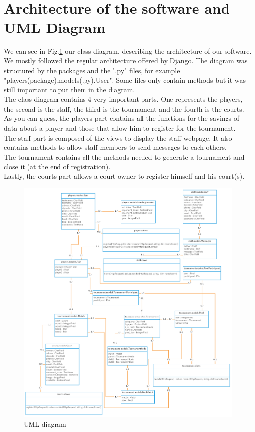 \documentclass[a4paper, 12pt]{article}
\begin{document}
\newpage
\section{Architecture of the software and UML Diagram}
We can see in Fig.\ref{UML_diagram} our class diagram, describing the architecture of our software. We mostly followed the regular architecture offered by Django. The diagram was structured by the packages and the ".py" files, for example "players(package).models(.py).User". Some files only contain methods but it was still important to put them in the diagram. 
\\

The class diagram contains 4 very important parts. One represents the players, the second is the staff, the third is the tournament and the fourth is the courts.\\

As you can guess, the players part contains all the functions for the savings of data about a player and those that allow him to register for the tournament.\\

The staff part is composed of the views to display the staff webpage. It also contains methods to allow staff members to send messages to each others.\\

The tournament contains all the methods needed to generate a tournament and close it (at the end of registration).\\

Lastly, the courts part allows a court owner to register himself and his court(s).\\

\noindent
\begin{figure}
	\caption{UML diagram}
	\label{UML_diagram}
	\includegraphics[width=18cm]{Class.png}

\end{figure}
\end{document}
